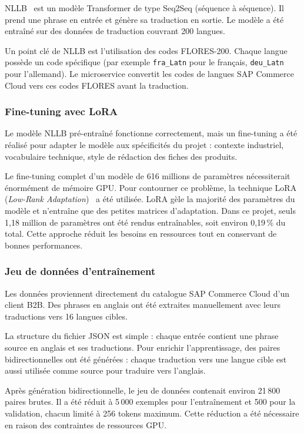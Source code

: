 NLLB~\cite{nllb} est un modèle Transformer de type Seq2Seq (séquence à séquence). Il prend une phrase en entrée et génère sa traduction en sortie. Le modèle a été entraîné sur des données de traduction couvrant 200 langues.

Un point clé de NLLB est l'utilisation des codes FLORES-200. Chaque langue possède un code spécifique (par exemple \texttt{fra\_Latn} pour le français, \texttt{deu\_Latn} pour l'allemand). Le microservice convertit les codes de langues SAP Commerce Cloud vers ces codes FLORES avant la traduction.

\subsubsection{Fine-tuning avec LoRA}

Le modèle NLLB pré-entraîné fonctionne correctement, mais un fine-tuning a été réalisé pour adapter le modèle aux spécificités du projet : contexte industriel, vocabulaire technique, style de rédaction des fiches des produits.

Le fine-tuning complet d'un modèle de 616 millions de paramètres nécessiterait énormément de mémoire GPU. Pour contourner ce problème, la technique LoRA (\textit{Low-Rank Adaptation})~\cite{lora} a été utilisée. LoRA gèle la majorité des paramètres du modèle et n'entraîne que des petites matrices d'adaptation. Dans ce projet, seuls 1,18 million de paramètres ont été rendus entraînables, soit environ 0,19\,\% du total. Cette approche réduit les besoins en ressources tout en conservant de bonnes performances.

\subsubsection{Jeu de données d'entraînement}

Les données proviennent directement du catalogue SAP Commerce Cloud d'un client B2B. Des phrases en anglais ont été extraites manuellement avec leurs traductions vers 16 langues cibles.

La structure du fichier JSON est simple : chaque entrée contient une phrase source en anglais et ses traductions. Pour enrichir l'apprentissage, des paires bidirectionnelles ont été générées : chaque traduction vers une langue cible est aussi utilisée comme source pour traduire vers l'anglais.

Après génération bidirectionnelle, le jeu de données contenait environ 21\,800 paires brutes. Il a été réduit à 5\,000 exemples pour l'entraînement et 500 pour la validation, chacun limité à 256 tokens maximum. Cette réduction a été nécessaire en raison des contraintes de ressources GPU.

